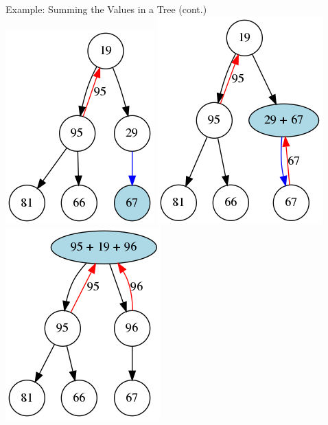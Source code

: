 \documentclass[11pt]{beamer}
\begin{document}
\begin{frame}{Example: Summing the Values in a Tree (cont.)}
\center
\includegraphics[scale=0.28]{summing_tree_7.png} \hspace{1em}
\includegraphics[scale=0.28]{summing_tree_8.png} \hspace{1em}
\includegraphics[scale=0.28]{summing_tree_9.png} \hspace{1em}

\end{frame}
\end{document}
